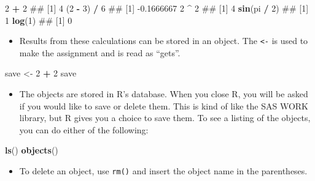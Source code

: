 \documentclass[]{book}
\newenvironment{Shaded}{\begin{snugshade}}{\end{snugshade}}
\newcommand{\KeywordTok}[1]{\textcolor[rgb]{0.13,0.29,0.53}{\textbf{#1}}}
\newcommand{\DecValTok}[1]{\textcolor[rgb]{0.00,0.00,0.81}{#1}}
\newcommand{\StringTok}[1]{\textcolor[rgb]{0.31,0.60,0.02}{#1}}
\newcommand{\OperatorTok}[1]{\textcolor[rgb]{0.81,0.36,0.00}{\textbf{#1}}}
\newcommand{\NormalTok}[1]{#1}
\providecommand{\tightlist}{%
  \setlength{\itemsep}{0pt}\setlength{\parskip}{0pt}}
\begin{document}
\begin{Shaded}
\begin{Highlighting}[]
\DecValTok{2} \OperatorTok{+}\StringTok{ }\DecValTok{2}
\NormalTok{## [1] 4}
\NormalTok{(}\DecValTok{2} \OperatorTok{-}\StringTok{ }\DecValTok{3}\NormalTok{) }\OperatorTok{/}\StringTok{ }\DecValTok{6}
\NormalTok{## [1] -0.1666667}
\DecValTok{2} \OperatorTok{^}\StringTok{ }\DecValTok{2}
\NormalTok{## [1] 4}
\KeywordTok{sin}\NormalTok{(pi }\OperatorTok{/}\StringTok{ }\DecValTok{2}\NormalTok{)}
\NormalTok{## [1] 1}
\KeywordTok{log}\NormalTok{(}\DecValTok{1}\NormalTok{)}
\NormalTok{## [1] 0}
\end{Highlighting}
\end{Shaded}

\begin{itemize}
\tightlist
\item
  Results from these calculations can be stored in an object. The
  \texttt{\textless{}-} is used to make the assignment and is read as
  ``gets''.
\end{itemize}

\begin{Shaded}
\begin{Highlighting}[]
\NormalTok{save <-}\StringTok{ }\DecValTok{2} \OperatorTok{+}\StringTok{ }\DecValTok{2}
\NormalTok{save}
\end{Highlighting}
\end{Shaded}

\begin{itemize}
\tightlist
\item
  The objects are stored in R's database. When you close R, you will be
  asked if you would like to save or delete them. This is kind of like
  the SAS WORK library, but R gives you a choice to save them. To see a
  listing of the objects, you can do either of the following:
\end{itemize}

\begin{Shaded}
\begin{Highlighting}[]
\KeywordTok{ls}\NormalTok{()}
\KeywordTok{objects}\NormalTok{()}
\end{Highlighting}
\end{Shaded}

\begin{itemize}
\tightlist
\item
  To delete an object, use \texttt{rm()} and insert the object name in
  the parentheses.
\end{itemize}
\end{document}
